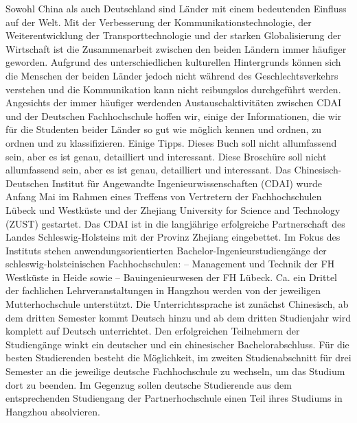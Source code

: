 \begin{minipage}{\linewidth}
	\Huge\sffamily{} \par
\end{minipage}

 \vspace*{3cm}
 \mypar
Sowohl China als auch Deutschland sind L\"ander mit einem bedeutenden Einfluss auf der Welt. Mit der Verbesserung der Kommunikationstechnologie, der Weiterentwicklung der Transporttechnologie und der starken Globalisierung der Wirtschaft ist die Zusammenarbeit zwischen den beiden Ländern immer häufiger geworden. Aufgrund des unterschiedlichen kulturellen Hintergrunds können sich die Menschen der beiden Länder jedoch nicht während des Geschlechtsverkehrs verstehen und die Kommunikation kann nicht reibungslos durchgeführt werden. Angesichts der immer häufiger werdenden Austauschaktivitäten zwischen CDAI und der Deutschen Fachhochschule hoffen wir, einige der Informationen, die wir für die Studenten beider L\"ander so gut wie möglich kennen und ordnen, zu ordnen und zu klassifizieren. Einige Tipps. Dieses Buch soll nicht allumfassend sein, aber es ist genau, detailliert und interessant. Diese Broschüre soll nicht allumfassend sein, aber es ist genau, detailliert und interessant.
\mypar
Das Chinesisch-Deutschen Institut für Angewandte Ingenieurwissenschaften (CDAI) wurde Anfang Mai im Rahmen eines Treffens von Vertretern der Fachhochschulen Lübeck und Westküste und der Zhejiang University for Science and Technology (ZUST) gestartet. Das CDAI ist in die langjährige erfolgreiche Partnerschaft des Landes Schleswig-Holsteins mit der Provinz Zhejiang eingebettet. Im Fokus des Instituts stehen anwendungsorientierten Bachelor-Ingenieurstudiengänge der schleswig-holsteinischen Fachhochschulen: – Management und Technik der FH Westküste in Heide sowie – Bauingenieurwesen der FH Lübeck. Ca. ein Drittel der fachlichen Lehrveranstaltungen in Hangzhou werden von der jeweiligen Mutterhochschule unterstützt. Die Unterrichtssprache ist zunächst Chinesisch, ab dem dritten Semester kommt Deutsch hinzu und ab dem dritten Studienjahr wird komplett auf Deutsch unterrichtet. Den erfolgreichen Teilnehmern der Studiengänge winkt ein deutscher und ein chinesischer Bachelorabschluss. Für die besten Studierenden besteht die Möglichkeit, im zweiten Studienabschnitt für drei Semester an die jeweilige deutsche Fachhochschule zu wechseln, um das Studium dort zu beenden. Im Gegenzug sollen deutsche Studierende aus dem entsprechenden Studiengang der Partnerhochschule einen Teil ihres Studiums in Hangzhou absolvieren.


